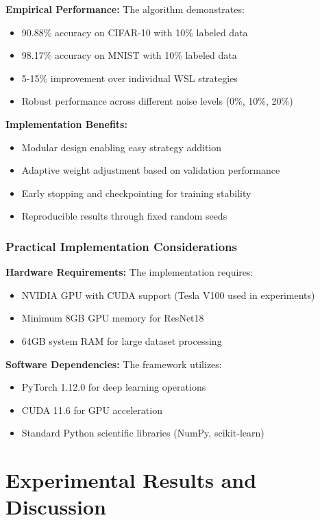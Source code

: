 \documentclass{ieeeaccess}
\begin{document}
\textbf{Empirical Performance:} The algorithm demonstrates:
\begin{itemize}
\item 90.88\% accuracy on CIFAR-10 with 10\% labeled data
\item 98.17\% accuracy on MNIST with 10\% labeled data
\item 5-15\% improvement over individual WSL strategies
\item Robust performance across different noise levels (0\%, 10\%, 20\%)
\end{itemize}

\textbf{Implementation Benefits:}
\begin{itemize}
\item Modular design enabling easy strategy addition
\item Adaptive weight adjustment based on validation performance
\item Early stopping and checkpointing for training stability
\item Reproducible results through fixed random seeds
\end{itemize}

\subsubsection{Practical Implementation Considerations}

\textbf{Hardware Requirements:} The implementation requires:
\begin{itemize}
\item NVIDIA GPU with CUDA support (Tesla V100 used in experiments)
\item Minimum 8GB GPU memory for ResNet18
\item 64GB system RAM for large dataset processing
\end{itemize}

\textbf{Software Dependencies:} The framework utilizes:
\begin{itemize}
\item PyTorch 1.12.0 for deep learning operations
\item CUDA 11.6 for GPU acceleration
\item Standard Python scientific libraries (NumPy, scikit-learn)
\end{itemize}

\section{Experimental Results and Discussion}
\label{sec:results}
\end{document}
